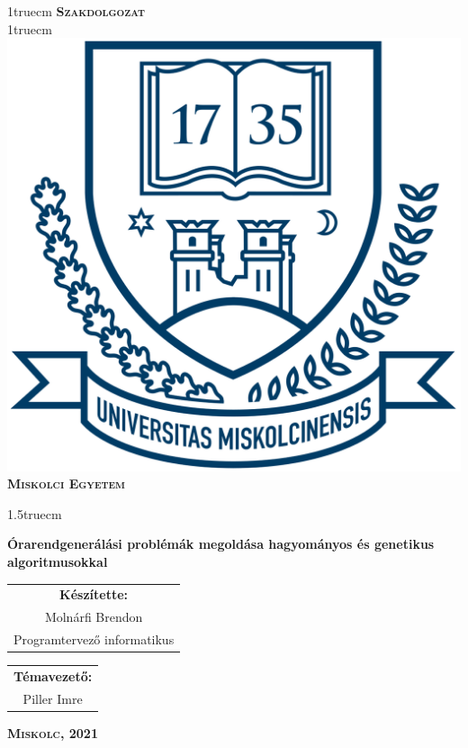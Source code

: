 \documentclass[12pt,a4paper]{report}
\begin{document}
\pagestyle{empty} %

{\large
\begin{center}
\vglue 1truecm
\textbf{\huge\textsc{Szakdolgozat}}\\
\vglue 1truecm
\includegraphics[width=4.8truecm, height=4truecm]{images/me_logo.png}\\
\textbf{\textsc{Miskolci Egyetem}}
\end{center}}

\vglue 1.5truecm %

{\LARGE
\begin{center}
\textbf{Órarendgenerálási problémák megoldása hagyományos és genetikus algoritmusokkal}
\end{center}}

\vspace*{2.5truecm}
{\large
\begin{center}
\begin{tabular}{c}
\textbf{Készítette:}\\
Molnárfi Brendon\\
Programtervező informatikus
\end{tabular}
\end{center}
\begin{center}
\begin{tabular}{c}
\textbf{Témavezető:}\\
Piller Imre
\end{tabular}
\end{center}}
\vfill
{\large
\begin{center}
\textbf{\textsc{Miskolc, 2021}}
\end{center}}
\end{document}
